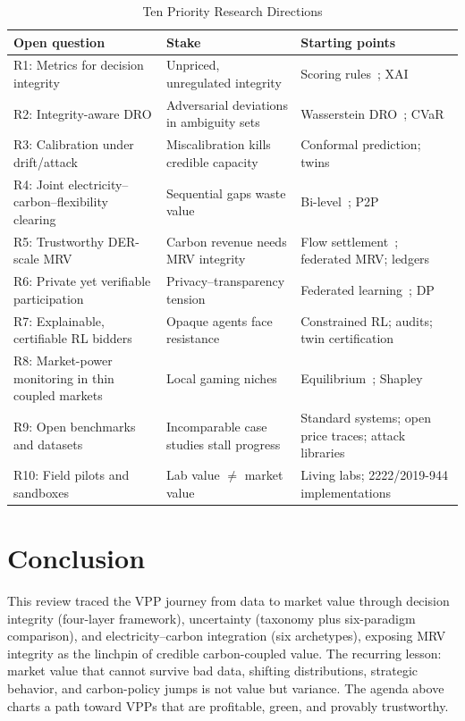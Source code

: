 \documentclass[journal]{IEEEtran}
\begin{document}
\begin{table}[htbp]
\caption{Ten Priority Research Directions}
\label{tab:agenda}
\centering
\begin{tabular}{p{4.6cm}p{4.4cm}p{5.6cm}}
\toprule
\textbf{Open question} & \textbf{Stake} & \textbf{Starting points} \\
\midrule
R1: Metrics for decision integrity & Unpriced, unregulated integrity & Scoring rules~\cite{gneiting2007}; XAI~\cite{lundberg2017,ribeiro2016} \\
R2: Integrity-aware DRO & Adversarial deviations in ambiguity sets & Wasserstein DRO~\cite{esfahani2018}; CVaR~\cite{rockafellar2000} \\
R3: Calibration under drift/attack & Miscalibration kills credible capacity & Conformal prediction; twins~\cite{tao2019} \\
R4: Joint electricity--carbon--flexibility clearing & Sequential gaps waste value & Bi-level~\cite{kardakos2016}; P2P~\cite{sousa2019} \\
R5: Trustworthy DER-scale MRV & Carbon revenue needs MRV integrity & Flow settlement~\cite{kang2015}; federated MRV; ledgers~\cite{andoni2019} \\
R6: Private yet verifiable participation & Privacy--transparency tension & Federated learning~\cite{mcmahan2017}; DP~\cite{dwork2006} \\
R7: Explainable, certifiable RL bidders & Opaque agents face resistance & Constrained RL; audits; twin certification \\
R8: Market-power monitoring in thin coupled markets & Local gaming niches & Equilibrium~\cite{nash1951}; Shapley~\cite{shapley1953} \\
R9: Open benchmarks and datasets & Incomparable case studies stall progress & Standard systems; open price traces; attack libraries \\
R10: Field pilots and sandboxes & Lab value $\neq$ market value & Living labs; 2222/2019-944 implementations \\
\bottomrule
\end{tabular}
\end{table}

\section{Conclusion}
This review traced the VPP journey from data to market value through decision integrity (four-layer framework), uncertainty (taxonomy plus six-paradigm comparison), and electricity--carbon integration (six archetypes), exposing MRV integrity as the linchpin of credible carbon-coupled value. The recurring lesson: market value that cannot survive bad data, shifting distributions, strategic behavior, and carbon-policy jumps is not value but variance. The agenda above charts a path toward VPPs that are profitable, green, and provably trustworthy.
\end{document}
